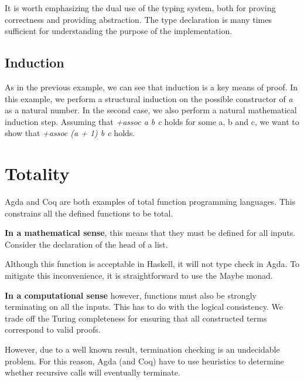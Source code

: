 \documentclass[12pt,twoside,notitlepage]{report}
\newcommand{\Conid}[1]{\mathit{#1}}
\newcommand{\Varid}[1]{\mathit{#1}}
\def\resethooks{%
  \global\let\SaveRestoreHook\empty
  \global\let\ColumnHook\empty}
\let\hspre\empty
\let\hspost\empty
\begin{document}
It is worth emphasizing the dual use of the typing system, both for proving correctness and providing abstraction. The type declaration is many times sufficient for understanding the purpose of the implementation.

\subsection{Induction}

As in the previous example, we can see that induction is a key means of proof. In this example, we perform a structural induction on the possible constructor of \textit{a} as a natural number. In the second case, we also perform a natural mathematical induction step. Assuming that \textit{+assoc a b c} holds for some a, b and c, we want to show that \textit{+assoc (a + 1) b c} holds.

\section{Totality}

Agda and Coq are both examples of total function programming languages. This constrains all the defined functions to be total. 


\textbf{In a mathematical sense}, this means that they must be defined for all inputs. Consider the declaration of the head of a list.

\resethooks

Although this function is acceptable in Haskell, it will not type check in Agda. To mitigate this inconvenience, it is straightforward to use the Maybe monad.

\textbf{In a computational sense} however, functions must also be strongly terminating on all the inputs. This has to do with the logical consistency. We trade off the Turing completeness for ensuring that all constructed terms correspond to valid proofs.

However, due to a well known result, termination checking is an undecidable problem. For this reason, Agda (and Coq) have to use heuristics to determine whether recursive calls will eventually terminate.
\end{document}
